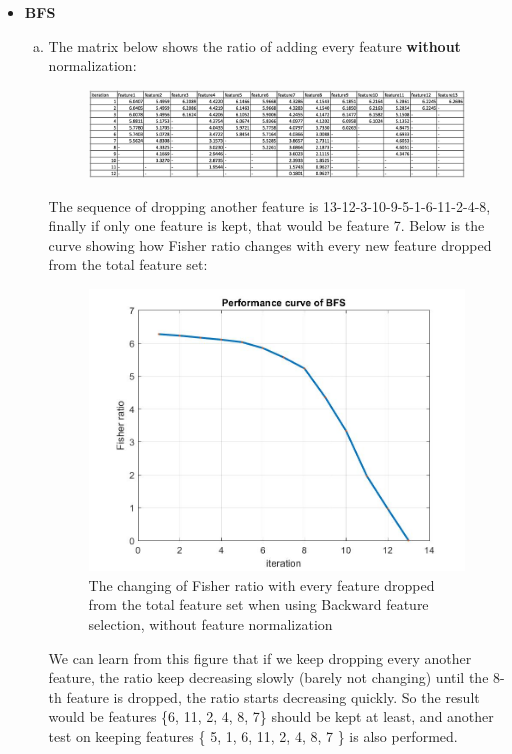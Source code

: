 \documentclass[a4paper]{article}
\begin{document}
\begin{spacing}{2.0}
\begin{enumerate}[(1)]
\begin{itemize}
\item \textbf{BFS}
\begin{enumerate}[(a)]
\item \large{The matrix below shows the ratio of adding every feature \textbf{without} normalization:}
\normalsize
\begin{figure}[H]
\centering
\includegraphics[width = 7.5in]{noNormalizetableBFS.jpg}
\label{BFS}
\end{figure}

The sequence of dropping another feature is 13-12-3-10-9-5-1-6-11-2-4-8, finally if only one feature is kept, that would be feature 7.
Below is the curve showing how Fisher ratio changes with every new feature dropped from the total feature set:
\begin{figure}[H]
\centering
\includegraphics[width = 4in]{BFS.jpg}
\caption{The changing of Fisher ratio with every feature dropped from the total feature set when using Backward feature selection, without feature normalization}
\end{figure}

We can learn from this figure that if we keep dropping every another feature, the ratio keep decreasing slowly (barely not changing) until the 8-th feature is dropped, the ratio starts decreasing quickly. So the result would be features \{6, 11, 2, 4, 8, 7\} should be kept at least, and another test on keeping features \{ 5, 1, 6, 11, 2, 4, 8, 7 \} is also performed.


\end{enumerate}
\end{itemize}
\end{enumerate}
\end{spacing}
\end{document}
